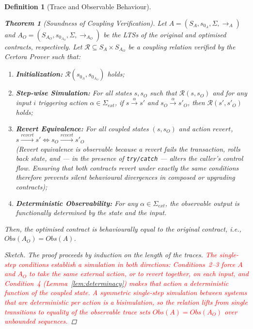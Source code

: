 \documentclass[manuscript,screen,review]{acmart}
\newcommand{\revised}[1]{\textcolor{red}{#1}}
\newtheorem{definition}{Definition}
\newtheorem{theorem}{Theorem}
\begin{document}
\begin{definition}[Trace and Observable Behaviour]
\begin{theorem}[Soundness of Coupling Verification]
\label{thm:soundness}
\!Let $A\! =\! (S_A, s_{0_A}, \!\Sigma, \to_A\!)$ and $A_O = (S_{A_O}, s_{0_{A_O}}, \Sigma, \to_{A_O})$ be the LTSs of the original and optimised contracts, respectively. Let $\mathcal{R} \subseteq S_A \times S_{A_O}$ be a coupling relation verified by the Certora Prover such that:
\begin{enumerate}
    \item \textbf{Initialization:} $\mathcal{R}(s_{0_A}, s_{0_{A_O}})$ holds;
    \item \textbf{Step-wise Simulation:} For all states $s, s_O$ such that $\mathcal{R}(s, s_O)$ and for any input $i$ triggering action $\alpha \in \Sigma_{ext}$, if $s \xrightarrow{\alpha} s'$ and $s_O \xrightarrow{\alpha} s'_O$, then $\mathcal{R}(s', s'_O)$ holds;
    \item \textbf{Revert Equivalence:} For all coupled states $(s, s_O)$ and action $\mathit{revert}$, $s \xrightarrow{\mathit{revert}} s' \iff s_O \xrightarrow{\mathit{revert}} s'_O$ \\
    (Revert equivalence is observable because a revert fails the transaction, rolls back state, and --- in the presence of \texttt{try/catch} --- alters the caller's control flow. Ensuring that both contracts revert under exactly the same conditions therefore prevents silent behavioural divergences in composed or upgrading contracts);
    \item \textbf{Deterministic Observability:} For any $\alpha \in \Sigma_{ext}$, the observable output is functionally determined by the state and the input.
\end{enumerate}
Then, the optimised contract is behaviourally equal to the original contract, i.e., $Obs(A_O) = Obs(A)$.
\end{theorem}

\begin{proof}[Sketch]
The proof proceeds by induction on the length of the traces. \revised{The single-step conditions establish a simulation in \emph{both} directions: Conditions~2--3 force $A$ and $A_O$ to take the same external action, or to revert together, on each input, and Condition~4 (Lemma~\ref{lem:determinacy}) makes that action a deterministic function of the coupled state. A symmetric single-step simulation between systems that are deterministic per action is a bisimulation, so the relation lifts from single transitions to equality of the observable trace sets $\mathit{Obs}(A) = \mathit{Obs}(A_O)$ over unbounded sequences.}


\end{proof}
\end{definition}
\end{document}
